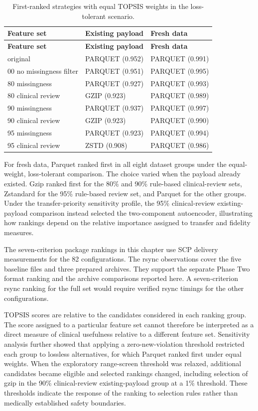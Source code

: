 \begin{longtable}[]{@{}lll@{}}
	\caption{First-ranked strategies with equal TOPSIS weights in the loss-tolerant scenario.}\label{tab:chapter4-7}\\
	\toprule\noalign{}
	\textbf{Feature set} & \textbf{Existing payload} & \textbf{Fresh data} \\
	\midrule\noalign{}
	\endfirsthead
	\toprule\noalign{}
	\textbf{Feature set} & \textbf{Existing payload} & \textbf{Fresh data} \\
	\midrule\noalign{}
	\endhead
	\bottomrule\noalign{}
	\endlastfoot
	original & PARQUET (0.952) & PARQUET (0.991) \\
	00 no missingness filter & PARQUET (0.951) & PARQUET (0.995) \\
	80 missingness & PARQUET (0.927) & PARQUET (0.993) \\
	80 clinical review & GZIP (0.923) & PARQUET (0.989) \\
	90 missingness & PARQUET (0.937) & PARQUET (0.997) \\
	90 clinical review & GZIP (0.923) & PARQUET (0.990) \\
	95 missingness & PARQUET (0.923) & PARQUET (0.994) \\
	95 clinical review & ZSTD (0.908) & PARQUET (0.986) \\
\end{longtable}

For fresh data, Parquet ranked first in all eight
dataset groups under the equal-weight, loss-tolerant comparison. The
choice varied when the payload already existed. Gzip ranked
first for the 80\% and 90\% rule-based clinical-review sets, Zstandard
for the 95\% rule-based review set, and Parquet for the other groups.
Under the transfer-priority sensitivity profile, the 95\%
clinical-review existing-payload comparison instead selected the
two-component autoencoder, illustrating how rankings depend on
the relative importance assigned to transfer and fidelity measures.

The seven-criterion package rankings in this chapter use SCP delivery measurements for the 82 configurations. The rsync observations cover the five baseline files and three prepared archives. They support the separate Phase Two format ranking and the archive comparisons reported here. A seven-criterion rsync ranking for the full set would require verified rsync timings for the other configurations.

TOPSIS scores are relative to the candidates considered in each ranking
group. The score assigned to a particular feature set cannot therefore
be interpreted as a direct measure of clinical usefulness relative to a
different feature set. Sensitivity analysis further showed that applying
a zero-new-violation threshold restricted each group to lossless
alternatives, for which Parquet ranked first under equal weights. When
the exploratory range-screen threshold was relaxed, additional
candidates became eligible and selected rankings changed, including
selection of gzip in the 90\% clinical-review existing-payload group at
a 1\% threshold. These thresholds indicate the response of the ranking
to selection rules rather than medically established safety boundaries.

